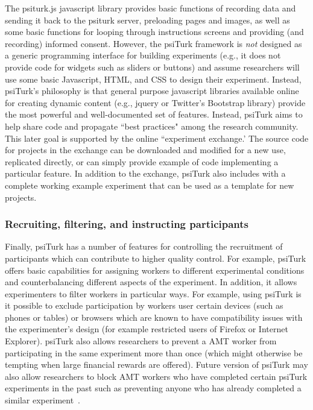 \documentclass[twocolumn]{svjour3}          %
\begin{document}
The psiturk.js javascript library provides basic functions of recording data and sending it back to the psiturk server,
preloading pages and images, as well as some basic functions for looping through instructions
screens and providing (and recording) informed consent.
However, the \textsf{psiTurk} framework is \emph{not} designed as a generic
programming interface for building 
experiments (e.g., it does not provide code for widgets such as sliders or buttons) and assume
researchers will use some basic Javascript, HTML, and CSS to design their experiment.  Instead, \textsf{psiTurk}'s
philosophy is that general purpose javascript libraries available online for creating dynamic content (e.g., jquery or
Twitter's Bootstrap library) provide the most powerful and well-documented set of features.  Instead, \textsf{psiTurk}
aims to help share code and propagate ``best practices" among the research community.
This later goal is supported by the online ``experiment exchange.'
The source code for projects in the exchange can be downloaded and modified for a new use,
replicated directly, or can simply provide example of code implementing a particular 
feature.  In addition to the exchange, \textsf{psiTurk} also includes with a complete working example 
experiment that can be used as a template for new projects.



\subsubsection{Recruiting, filtering, and instructing participants}
Finally, \textsf{psiTurk} has a number of features for controlling the recruitment
of participants which can contribute to higher quality control.
For example, \textsf{psiTurk} offers basic capabilities for assigning workers to different experimental conditions 
and counterbalancing different aspects of the experiment.
In addition, it allows experimenters to filter workers in particular ways.  For example, using \textsf{psiTurk}
is it possible to exclude participation by workers user certain devices (such as phones or tables) or browsers
which are known to have compatibility issues with the experimenter's design (for example restricted
users of Firefox or Internet Explorer).  \textsf{psiTurk} also allows researchers to prevent a AMT worker from 
participating in the same experiment more than once (which might otherwise be tempting when
large financial rewards are offered).  Future version of \textsf{psiTurk} may also allow researchers to 
block AMT workers who have completed certain \textsf{psiTurk} experiments in the past such as
preventing anyone who has already completed a similar experiment~\citep[see][for a discussion about non-naivety amongst AMT workers]{chandler2014nonnaivete}.
\end{document}
